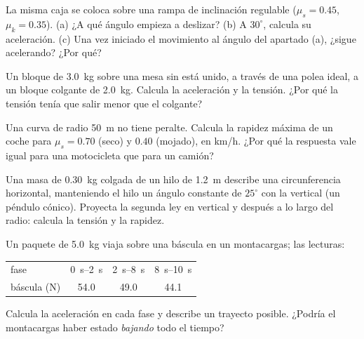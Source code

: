\begin{exercise}[$\star\star$]\label{exo:g12:newtons-laws:7}
La misma caja se coloca sobre una rampa de inclinación regulable ($\mu_s = 0.45$,
$\mu_k = 0.35$). (a) ¿A qué ángulo empieza a deslizar? (b) A $30^\circ$, calcula su
aceleración. (c) Una vez iniciado el movimiento al ángulo del apartado (a), ¿sigue
acelerando? ¿Por qué?
\end{exercise}

\begin{exercise}[$\star\star$]\label{exo:g12:newtons-laws:8}
Un bloque de \qty{3.0}{kg} sobre una mesa sin  está unido, a través de una
polea ideal, a un bloque colgante de \qty{2.0}{kg}. Calcula la aceleración y la
tensión. ¿Por qué la tensión tenía que salir menor que el  colgante?
\end{exercise}

\begin{exercise}[$\star\star$]\label{exo:g12:newtons-laws:9}
Una curva de radio \qty{50}{m} no tiene peralte. Calcula la rapidez máxima de un coche
para $\mu_s = 0.70$ (seco) y $0.40$ (mojado), en \unit{km/h}. ¿Por qué la respuesta
vale igual para una motocicleta que para un camión?
\end{exercise}

\begin{exercise}[$\star\star$]\label{exo:g12:newtons-laws:10}
Una masa de \qty{0.30}{kg} colgada de un hilo de \qty{1.2}{m} describe una
circunferencia horizontal, manteniendo el hilo un ángulo constante de $25^\circ$ con
la vertical (un péndulo cónico). Proyecta la segunda ley en vertical y después a lo
largo del radio: calcula la tensión y la rapidez.
\end{exercise}

\begin{exercise}[$\star\star$]\label{exo:g12:newtons-laws:11}
Un paquete de \qty{5.0}{kg} viaja sobre una báscula en un montacargas; las lecturas:
\begin{center}\small\begin{tabular}{lccc}
fase & \qtyrange{0}{2}{s} & \qtyrange{2}{8}{s} & \qtyrange{8}{10}{s}\\
báscula (\unit{N}) & 54.0 & 49.0 & 44.1
\end{tabular}\end{center}
Calcula la aceleración en cada fase y describe un trayecto posible. ¿Podría el
montacargas haber estado \emph{bajando} todo el tiempo?
\end{exercise}

